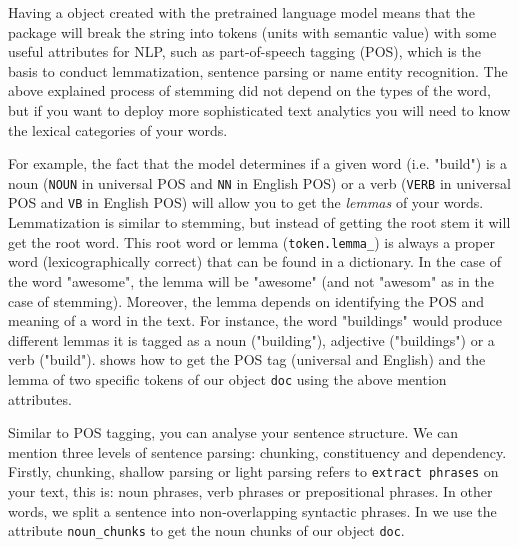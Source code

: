 
Having a  object created with the pretrained language model means that the package will break the string into tokens (units with semantic value) with some useful attributes for NLP, such as part-of-speech tagging (POS), which is the basis to conduct lemmatization, sentence parsing or name entity recognition. The above explained process of stemming did not depend on the types of the word, but if you want to deploy more sophisticated text analytics you will need to know the lexical categories of your words. 




For example, the fact that the model determines if a given word (i.e. "build") is a noun (\texttt{NOUN} in universal POS and \texttt{NN} in English POS) or a verb (\texttt{VERB} in universal POS and \texttt{VB} in English POS) will allow you to get the \textit{lemmas} of your words. Lemmatization is similar to stemming, but instead of getting the root stem it will get the root word. This root word or lemma (\verb|token.lemma_|) is always a proper word (lexicographically correct) that can be found in a dictionary. In the case of the word "awesome", the lemma will be "awesome" (and not "awesom" as in the case of stemming). Moreover, the lemma depends on identifying the POS and meaning of a word in the text. For instance, the word "buildings" would produce different lemmas it is tagged as a noun ("building"), adjective ("buildings") or a verb ("build").  shows how to get the POS tag (universal and English) and the lemma of two specific tokens of our object \texttt{doc} using the above mention attributes.


Similar to POS tagging, you can analyse your sentence structure. We can mention three levels of sentence parsing: chunking, constituency and dependency. Firstly, chunking, shallow parsing or light parsing refers to \texttt{extract phrases} on your text, this is: noun phrases, verb phrases or prepositional phrases.  In other words, we split a sentence into non-overlapping syntactic phrases. In  we use the attribute \verb|noun_chunks| to get the noun chunks of our  object \texttt{doc}.

